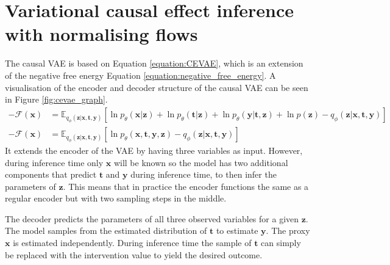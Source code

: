 \documentclass{report}
\newcommand{\E}{\mathbb{E}}
\newcommand{\bt}{\mathbf{t}}
\newcommand{\bx}{\mathbf{x}}
\newcommand{\by}{\mathbf{y}}
\newcommand{\bz}{\mathbf{z}}
\begin{document}
\section{Variational causal effect inference with normalising flows}\label{section:CEVAE_flow}
The causal VAE is based on Equation \ref{equation:CEVAE}, which is an extension of the negative free energy Equation \ref{equation:negative_free_energy}. A visualisation of the encoder and decoder structure of the causal VAE can be seen in Figure \ref{fig:cevae_graph}.
\begin{equation}\label{equation:CEVAE}
    \begin{split}
    -\mathcal{F}(\bx) &= \E_{q_\phi(\bz|\bx, \bt, \by)}\left[\ln p_\theta(\bx| \bz) + \ln p_\theta(\bt | \bz)+ \ln p_\theta(\by |\bt, \bz) +\ln p(\bz) - q_\phi(\bz | \bx, \bt, \by)\right]\\
    -\mathcal{F}(\bx) &= \E_{q_\phi(\bz|\bx, \bt, \by)}\left[\ln p_\theta(\bx, \bt, \by, \bz) - q_\phi(\bz | \bx, \bt, \by)\right]
    \end{split}
\end{equation}
It extends the encoder of the VAE by having three variables as input. However, during inference time only $\bx$ will be known so the model has two additional components that predict $\bt$ and $\by$ during inference time, to then infer the parameters of $\bz$. This means that in practice the encoder functions the same as a regular encoder but with two sampling steps in the middle.

The decoder predicts the parameters of all three observed variables for a given $\bz$. The model samples from the estimated distribution of $\bt$ to estimate $\by$. The proxy $\bx$ is estimated independently. During inference time the sample of $\bt$ can simply be replaced with the intervention value to yield the desired outcome.


\end{document}
